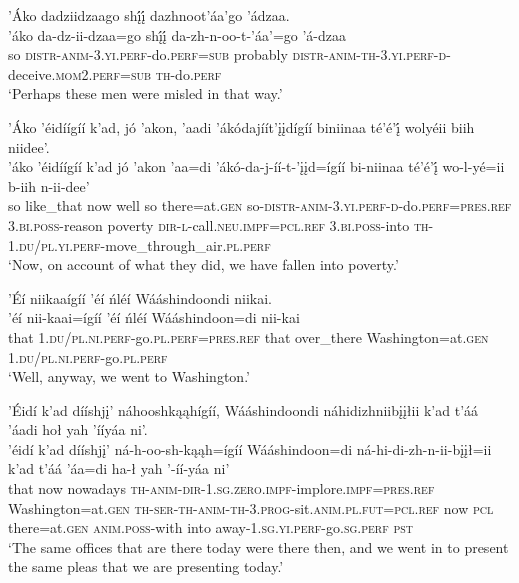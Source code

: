 \ea\label{ex:text7-10-14}
’Áko dadziidzaago shį́į́ dazhnoot’áa’go ’ádzaa.\\
\gll ’áko	da-dz-ii-dzaa=go	shį́į́	da-zh-n-oo-t-’áa’=go	’á-dzaa\\
     so	\textsc{distr}-\textsc{anim}-3.\textsc{yi}.\textsc{perf}-do.\textsc{perf}=\textsc{sub}	probably	\textsc{distr}-\textsc{anim}-\textsc{th}-3.\textsc{yi}.\textsc{perf}-\textsc{d}-deceive.\textsc{mom}2.\textsc{perf}=\textsc{sub}	\textsc{th}-do.\textsc{perf}\\
\glt `Perhaps these men were misled in that way.'
\z

\ea\label{ex:text7-11}
’Áko ’éidíígíí k’ad, jó ’akon, ’aadi ’ákódajíít’įįdígíí biniinaa té’é’į́ wolyéii biih niidee’.\\
\gll ’áko	’éidíígíí	k’ad	jó	’akon	’aa=di	’ákó-da-j-íí-t-’įįd=ígíí	bi-niinaa	té’é’į́	wo-l-yé=ii	b-iih	n-ii-dee’\\
     so	like\_that	now	well	so	there=at.\textsc{gen}	so-\textsc{distr}-\textsc{anim}-3.\textsc{yi}.\textsc{perf}-\textsc{d}-do.\textsc{perf}=\textsc{pres}.\textsc{ref}	3.\textsc{bi}.\textsc{poss}-reason	poverty	\textsc{dir}-\textsc{l}-call.\textsc{neu}.\textsc{impf}=\textsc{pcl}.\textsc{ref}	3.\textsc{bi}.\textsc{poss}-into	\textsc{th}-1.\textsc{du}/\textsc{pl}.\textsc{yi}.\textsc{perf}-move\_through\_air.\textsc{pl}.\textsc{perf}\\
\glt `Now, on account of what they did, we have fallen into poverty.'
\z

\ea\label{ex:text7-12-1}
’Éí niikaaígíí ’éí ńléí Wááshindoondi niikai.\\
\gll ’éí	nii-kaai=ígíí	’éí	ńléí	Wááshindoon=di	nii-kai\\
     that	1.\textsc{du}/\textsc{pl}.\textsc{ni}.\textsc{perf}-go.\textsc{pl}.\textsc{perf}=\textsc{pres}.\textsc{ref}	that	over\_there	Washington=at.\textsc{gen}	1.\textsc{du}/\textsc{pl}.\textsc{ni}.\textsc{perf}-go.\textsc{pl}.\textsc{perf}\\
\glt `Well, anyway, we went to Washington.'
\z

\ea\label{ex:text7-12-2}
’Éidí k’ad dííshjį’ náhooshkąąhígíí, Wááshindoondi náhidizhniibįįłii k’ad t’áá ’áadi hoł yah ’ííyáa ni’.\\
\gll ’éidí	k’ad	dííshjį’	ná-h-oo-sh-kąąh=ígíí	Wááshindoon=di	ná-hi-di-zh-n-ii-bįįł=ii	k’ad	t’áá	’áa=di	ha-ł	yah	’-íí-yáa	ni’\\
     that	now	nowadays	\textsc{th}-\textsc{anim}-\textsc{dir}-1.\textsc{sg}.\textsc{zero}.\textsc{impf}-implore.\textsc{impf}=\textsc{pres}.\textsc{ref}	Washington=at.\textsc{gen}	\textsc{th}-\textsc{ser}-\textsc{th}-\textsc{anim}-\textsc{th}-3.\textsc{prog}-sit.\textsc{anim}.\textsc{pl}.\textsc{fut}=\textsc{pcl}.\textsc{ref}	now	\textsc{pcl}	there=at.\textsc{gen}	\textsc{anim}.\textsc{poss}-with	into	away-1.\textsc{sg}.\textsc{yi}.\textsc{perf}-go.\textsc{sg}.\textsc{perf}	\textsc{pst}\\
\glt `The same offices that are there today were there then, and we went in to present the same pleas that we are presenting today.'
\z

